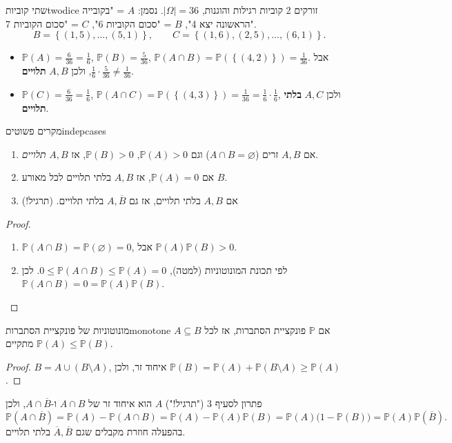 \documentclass[11pt,a4paper]{report}
\newcommand{\flag}{\tikz[baseline=-0.1ex,x=0.9ex,y=0.9ex]{\draw[line width=0.5pt] (0,-0.3)--(0,1.6); \fill (0,1.6)--(1.2,1.2)--(0,0.8)--cycle;}}
\newcounter{todo}
\newcommand{\addtodo}[1]{\refstepcounter{todo}%
  \addcontentsline{tdo}{todo}{\protect\numberline{\thetodo}#1}}
\newcommand{\needcheck}[1]{\addtodo{#1}%
  {\color{todoc}\sffamily\small\,[\textbf{\flag{}\,\thetodo\ לבדיקה:} #1]\,}}
\renewcommand{\needcheck}[1]{}
\newcommand{\set}[1]{\left\{#1\right\}}
\newcommand{\comp}[1]{\overline{#1}}
\renewcommand{\emptyset}{\varnothing}
\newcommand{\PP}{\mathbb{P}}
\begin{document}
\begin{example}{שתי קוביות}{twodice}
זורקים 2 קוביות רגילות והוגנות, $|\Omega|=36$. נסמן: $A$ = "בקובייה הראשונה יצא 4", $B$ = "סכום הקוביות 6", $C$ = "סכום הקוביות 7".
\[
  B=\set{(1,5),\dots,(5,1)},\qquad C=\set{(1,6),(2,5),\dots,(6,1)}.
\]
\begin{itemize}
  \item $\PP(A)=\frac6{36}=\frac16$, $\PP(B)=\frac5{36}$, $\PP(A\cap B)=\PP(\set{(4,2)})=\frac1{36}$. אבל $\frac16\cdot\frac5{36}\neq\frac1{36}$, ולכן $A,B$ \textbf{תלויים}.
  \item $\PP(C)=\frac6{36}=\frac16$, $\PP(A\cap C)=\PP(\set{(4,3)})=\frac1{36}=\frac16\cdot\frac16$, ולכן $A,C$ \textbf{בלתי תלויים}.
\end{itemize}
\needcheck{ברשימות נכתב $\PP(A\cap C)=\frac16$; תיקנתי ל-$\frac1{36}$}
\end{example}

\begin{claim}{מקרים פשוטים}{indepcases}
\begin{enumerate}
  \item אם $A,B$ זרים ($A\cap B=\emptyset$) וגם $\PP(A)>0$, $\PP(B)>0$, אז $A,B$ \emph{תלויים}.
  \item אם $\PP(A)=0$, אז $A,B$ בלתי תלויים לכל מאורע $B$.
  \item אם $A,B$ בלתי תלויים, אז גם $A,\comp B$ בלתי תלויים. (תרגיל!)
\end{enumerate}
\end{claim}
\begin{proof}
\begin{enumerate}
  \item $\PP(A\cap B)=\PP(\emptyset)=0$, אבל $\PP(A)\PP(B)>0$.
  \item לפי תכונת המונוטוניות (למטה), $0\le\PP(A\cap B)\le\PP(A)=0$. לכן $\PP(A\cap B)=0=\PP(A)\PP(B)$.\qedhere
\end{enumerate}
\end{proof}

\begin{claim}{מונוטוניות של פונקציית הסתברות}{monotone}
אם $\PP$ פונקציית הסתברות, אז לכל $A\subseteq B$ מתקיים $\PP(A)\le\PP(B)$.
\end{claim}
\begin{proof}
$B=A\cup(B\setminus A)$, איחוד זר, ולכן $\PP(B)=\PP(A)+\PP(B\setminus A)\ge\PP(A)$.
\end{proof}

\begin{suggestion}{פתרון לסעיף 3 ("תרגיל!")}
$A$ הוא איחוד זר של $A\cap B$ ו-$A\cap\comp B$, ולכן
\[
  \PP(A\cap\comp B)=\PP(A)-\PP(A\cap B)=\PP(A)-\PP(A)\PP(B)=\PP(A)\big(1-\PP(B)\big)=\PP(A)\PP(\comp B).
\]
בהפעלה חוזרת מקבלים שגם $\comp A,\comp B$ בלתי תלויים.
\end{suggestion}
\end{document}
